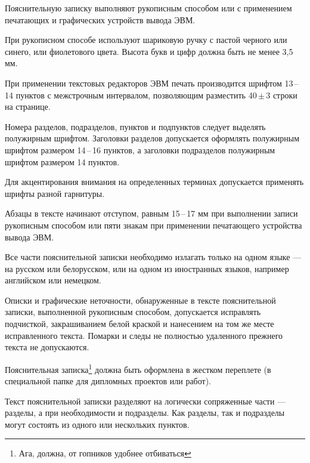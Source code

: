 




\tableofcontents
\pagebreak


Пояснительную  записку  выполняют  рукописным  способом  или  с применением печатающих и графических устройств вывода ЭВМ. 

При рукописном способе используют шариковую ручку с пастой черного или синего, или фиолетового цвета. Высота букв и цифр должна быть не менее 3,5 мм. 

При применении текстовых редакторов ЭВМ печать производится шрифтом 13\,--\,14  пунктов  с  межстрочным  интервалом,  позволяющим  разместить  
40\,\( \pm \)\,3 строки на странице. 

Номера  разделов,  подразделов,  пунктов и подпунктов следует выделять полужирным  шрифтом.  Заголовки  разделов  допускается  оформлять  полужирным шрифтом размером 14\,--\,16 пунктов, а заголовки подразделов полужирным шрифтом размером 14 пунктов. 

Для  акцентирования  внимания  на  определенных  терминах  допускается применять шрифты разной гарнитуры. 

Абзацы в тексте начинают отступом, равным 15\,--\,17 мм при выполнении  записи  рукописным  способом  или  пяти  знакам  при  применении  печатающего устройства вывода ЭВМ.

Все  части  пояснительной  записки  необходимо  излагать  только  на одном языке --- на русском или белорусском, или на одном из иностранных языков, например английском или немецком.

Описки и графические неточности, обнаруженные в тексте пояснительной записки, выполненной рукописным способом, допускается исправлять подчисткой, закрашиванием белой краской и нанесением на том же месте исправленного текста. Помарки и следы не полностью удаленного прежнего текста не допускаются.

Пояснительная записка\footnote{Ага, должна, от гопников удобнее отбиваться} должна быть оформлена в жестком переплете (в специальной папке для дипломных проектов или работ).

Текст пояснительной записки разделяют на логически сопряженные части --- разделы, а при необходимости и подразделы. Как разделы, так и подразделы могут состоять из одного или нескольких пунктов.

